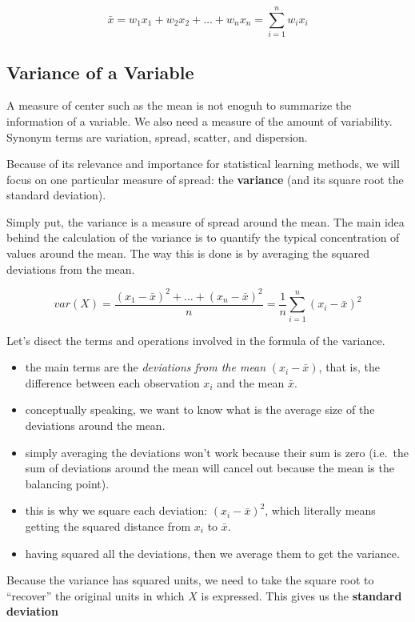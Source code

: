 \documentclass[]{book}
\begin{document}
\[
\bar{x} = w_1 x_1 + w_2 x_2 + \dots + w_n x_n = \sum_{i=1}^{n} w_i x_i
\]

\hypertarget{variance-of-a-variable}{%
\subsection{Variance of a Variable}\label{variance-of-a-variable}}

A measure of center such as the mean is not enoguh to summarize the information
of a variable. We also need a measure of the amount of variability.
Synonym terms are variation, spread, scatter, and dispersion.

Because of its relevance and importance for statistical learning methods, we
will focus on one particular measure of spread: the \textbf{variance}
(and its square root the standard deviation).

Simply put, the variance is a measure of spread around the mean. The main idea
behind the calculation of the variance is to quantify the typical concentration
of values around the mean. The way this is done is by averaging the squared
deviations from the mean.

\[
var(X) = \frac{(x_1 - \bar{x})^2 + \dots + (x_n - \bar{x})^2}{n} = \frac{1}{n} \sum_{i=1}^{n} (x_i - \bar{x})^2
\]

Let's disect the terms and operations involved in the formula of the variance.

\begin{itemize}
\item
  the main terms are the \emph{deviations from the mean} \((x_i - \bar{x})\), that is, the difference between each observation \(x_i\) and the mean \(\bar{x}\).
\item
  conceptually speaking, we want to know what is the average size of the deviations around the mean.
\item
  simply averaging the deviations won't work because their sum is zero (i.e.~the sum of deviations around the mean will cancel out because the mean is the balancing point).
\item
  this is why we square each deviation: \((x_i - \bar{x})^2\), which literally means getting the squared distance from \(x_i\) to \(\bar{x}\).
\item
  having squared all the deviations, then we average them to get the variance.
\end{itemize}

Because the variance has squared units, we need to take the square root to
``recover'' the original units in which \(X\) is expressed.
This gives us the \textbf{standard deviation}
\end{document}
